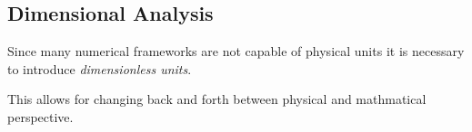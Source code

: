 \subsection{Dimensional Analysis}

Since many numerical frameworks are not capable of physical units it is
necessary to introduce \emph{dimensionless units}.

This allows for changing back and forth between physical and mathmatical
perspective.


